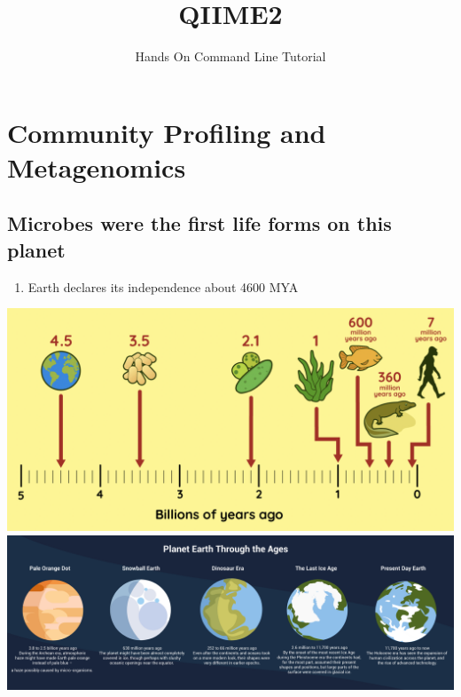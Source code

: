 \documentclass[
]{book}
\title{QIIME2}
\subtitle{Hands On Command Line Tutorial}
\author{}
\date{\vspace{-2.5em}}
\providecommand{\tightlist}{%
  \setlength{\itemsep}{0pt}\setlength{\parskip}{0pt}}
\begin{document}
\maketitle

{
\setcounter{tocdepth}{1}
\tableofcontents
}
\hypertarget{community-profiling-and-metagenomics}{%
\chapter{Community Profiling and Metagenomics}\label{community-profiling-and-metagenomics}}

\hypertarget{microbes-were-the-first-life-forms-on-this-planet}{%
\section{Microbes were the first life forms on this planet}\label{microbes-were-the-first-life-forms-on-this-planet}}

\begin{enumerate}
\def\labelenumi{\arabic{enumi}.}
\tightlist
\item
  Earth declares its independence about 4600 MYA
\end{enumerate}

\includegraphics[width=1\textwidth,height=\textheight]{./Figures/4billionyrs.png}
\includegraphics[width=1\textwidth,height=\textheight]{./Figures/Planets.png}
\end{document}
